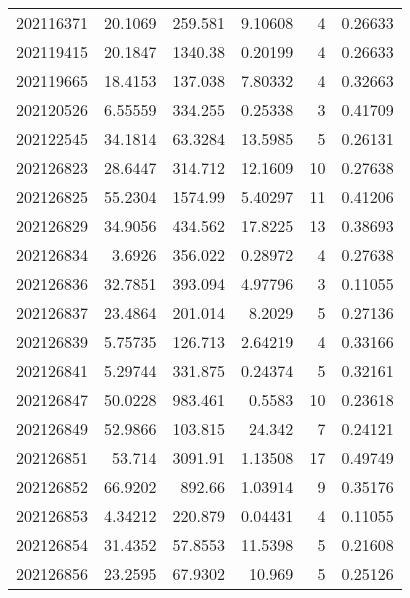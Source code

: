 \begin{tabular}{rrrrrr}
 202116371 &         20.1069  &      259.581  &            9.10608 &           4 & 0.26633 \\
 202119415 &         20.1847  &     1340.38   &            0.20199 &           4 & 0.26633 \\
 202119665 &         18.4153  &      137.038  &            7.80332 &           4 & 0.32663 \\
 202120526 &          6.55559 &      334.255  &            0.25338 &           3 & 0.41709 \\
 202122545 &         34.1814  &       63.3284 &           13.5985  &           5 & 0.26131 \\
 202126823 &         28.6447  &      314.712  &           12.1609  &          10 & 0.27638 \\
 202126825 &         55.2304  &     1574.99   &            5.40297 &          11 & 0.41206 \\
 202126829 &         34.9056  &      434.562  &           17.8225  &          13 & 0.38693 \\
 202126834 &          3.6926  &      356.022  &            0.28972 &           4 & 0.27638 \\
 202126836 &         32.7851  &      393.094  &            4.97796 &           3 & 0.11055 \\
 202126837 &         23.4864  &      201.014  &            8.2029  &           5 & 0.27136 \\
 202126839 &          5.75735 &      126.713  &            2.64219 &           4 & 0.33166 \\
 202126841 &          5.29744 &      331.875  &            0.24374 &           5 & 0.32161 \\
 202126847 &         50.0228  &      983.461  &            0.5583  &          10 & 0.23618 \\
 202126849 &         52.9866  &      103.815  &           24.342   &           7 & 0.24121 \\
 202126851 &         53.714   &     3091.91   &            1.13508 &          17 & 0.49749 \\
 202126852 &         66.9202  &      892.66   &            1.03914 &           9 & 0.35176 \\
 202126853 &          4.34212 &      220.879  &            0.04431 &           4 & 0.11055 \\
 202126854 &         31.4352  &       57.8553 &           11.5398  &           5 & 0.21608 \\
 202126856 &         23.2595  &       67.9302 &           10.969   &           5 & 0.25126 \\

\end{tabular}
